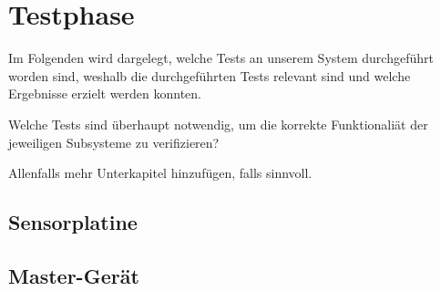 \chapter{Testphase}
\label{chap:testphase}

Im Folgenden  wird dargelegt,  welche Tests  an unserem  System durchgef\"uhrt
worden  sind, weshalb  die  durchgef\"uhrten Tests  relevant  sind und  welche
Ergebnisse erzielt werden konnten.

\anweisung  Welche   Tests  sind   \"uberhaupt  notwendig,  um   die  korrekte
Funktionali\"at der jeweiligen Subsysteme zu verifizieren?

\anweisung Allenfalls mehr Unterkapitel hinzuf\"ugen, falls sinnvoll.

\section{Sensorplatine}
\label{sec:test:sensorplatine}


\section{Master-Ger\"at}
\label{sec:test:master}
